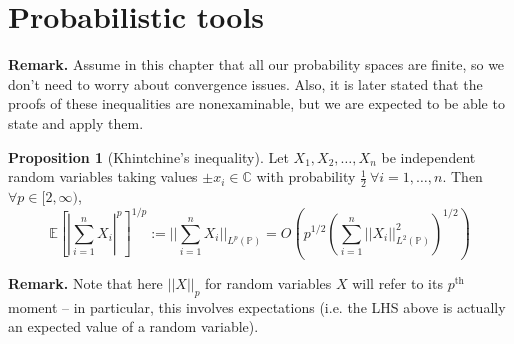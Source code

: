 \documentclass{article}
\theoremstyle{definition}
\newtheorem{prop}[theorem]{Proposition}
\begin{document}
\section{Probabilistic tools}
\textbf{Remark.} Assume in this chapter that all our probability spaces are finite, so we don't need to worry about convergence issues. Also, it is later stated that the proofs of these inequalities are nonexaminable, but we are expected to be able to state and apply them.
\begin{prop}[Khintchine's inequality]\label{prop3.1}
    Let $X_1,X_2,\ldots,X_n$ be independent random variables taking values $\pm x_i \in \mathbb{C}$ with probability $\frac{1}{2} ~\forall i=1,\ldots,n$. Then $\forall p \in [2,\infty)$, \[
    \mathbb{E} \left[|\sum_{i=1}^{n} X_i|^p\right]^{1/p} := ||\sum_{i=1}^{n} X_i ||_{L^p(\mathbb{P})} = O \left(p^{1/2}\left(\sum_{i=1}^{n} ||X_i||_{L^2(\mathbb{P})}^2\right)^{1/2}\right)
    \]
\end{prop}
\textbf{Remark.} Note that here $||X||_{p}$ for random variables $X$ will refer to its $p^{\text{th}}$ moment -- in particular, this involves expectations (i.e. the LHS above is actually an expected value of a random variable).
\end{document}
